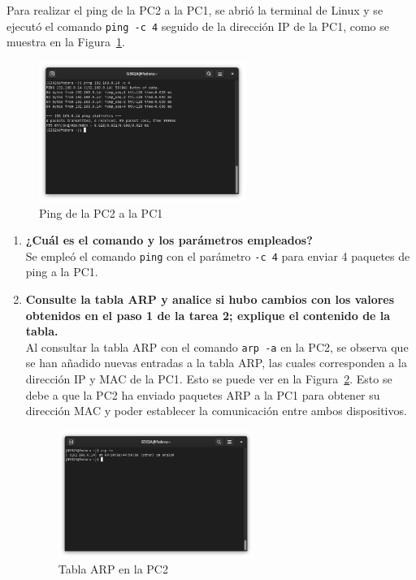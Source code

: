         Para realizar el ping de la PC2 a la PC1, se abrió la terminal de Linux y se ejecutó el comando \texttt{ping -c 4} seguido de la dirección IP de la PC1, como se muestra en la Figura~\ref{fig:ping}.

        \begin{figure}[H]
            \centering
            \includegraphics[width=0.6\textwidth]{img/ping_linux.png}
            \caption{Ping de la PC2 a la PC1}
            \label{fig:ping}
        \end{figure}

        \begin{enumerate}
            \item \textbf{¿Cuál es el comando y los parámetros empleados?}\\
            Se empleó el comando \texttt{ping} con el parámetro \texttt{-c 4} para enviar 4 paquetes de ping a la PC1.
            \item \textbf{Consulte la tabla ARP y analice si hubo cambios con los valores obtenidos en el paso 1 de la tarea 2; explique el contenido de la tabla.}\\
            Al consultar la tabla ARP con el comando \texttt{arp -a} en la PC2, se observa que se han añadido nuevas entradas a la tabla ARP, las cuales corresponden a la dirección IP y MAC de la PC1. Esto se puede ver en la Figura~\ref{fig:tabla_arp_linux}. Esto se debe a que la PC2 ha enviado paquetes ARP a la PC1 para obtener su dirección MAC y poder establecer la comunicación entre ambos dispositivos. 
            \begin{figure}[H]
                \centering
                \includegraphics[width=0.6\textwidth]{img/tablaARP_linux.png}
                \caption{Tabla ARP en la PC2}
                \label{fig:tabla_arp_linux}
            \end{figure}
        \end{enumerate}
